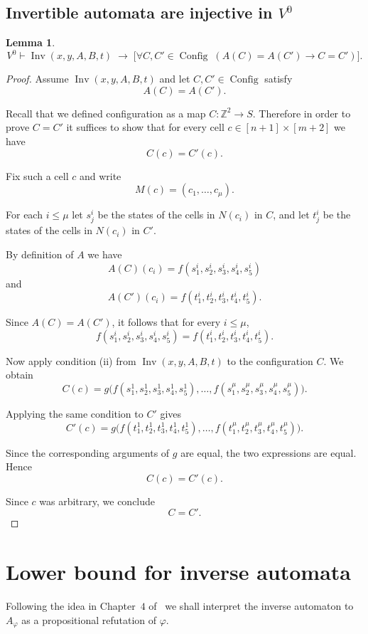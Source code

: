 \documentclass{article}
\theoremstyle{plain}
\newtheorem{lemma}[theorem]{Lemma}
\theoremstyle{definition}
\DeclareMathOperator{\Config}{Config}
\DeclareMathOperator{\Inv}{Inv}
\begin{document}
\subsection{Invertible automata are injective in $V^0$}

\begin{lemma}\label{lm:invertible_implies_injective}
\[
V^0 \vdash
\Inv(x,y,A,B,t)
\;\rightarrow\;
\bigl[
\forall C,C' \in \Config\;
(A(C)=A(C') \rightarrow C=C')
\bigr].
\]
\end{lemma}
\begin{proof}
Assume $\Inv(x,y,A,B,t)$ and let $C,C' \in \Config$ satisfy
\[
A(C)=A(C').
\]

Recall that we defined configuration as a map 
$C : \mathbb{Z}^2 \to S$. Therefore in order to prove $C=C'$ it suffices to show that for every cell
$c \in [n+1]\times[m+2]$ we have
\[
C(c)=C'(c).
\]

Fix such a cell $c$ and write
\[
M(c)=(c_1,\dots,c_\mu).
\]

For each $i\le \mu$ let $s^i_j$ be the states of the cells in $N(c_i)$ in $C$, and let $t^i_j$ be the states of the cells in $N(c_i)$ in $C'$.

By definition of $A$ we have
\[
A(C)(c_i)=f(s^i_1,s^i_2,s^i_3,s^i_4,s^i_5)
\]
and
\[
A(C')(c_i)=f(t^i_1,t^i_2,t^i_3,t^i_4,t^i_5).
\]

Since $A(C)=A(C')$, it follows that for every $i\le\mu$,
\[
f(s^i_1,s^i_2,s^i_3,s^i_4,s^i_5)
=
f(t^i_1,t^i_2,t^i_3,t^i_4,t^i_5).
\]

Now apply condition (ii) from $\Inv(x,y,A,B,t)$ to the
configuration $C$. We obtain
\[
C(c)=
g\bigl(
f(s^1_1,s^1_2,s^1_3,s^1_4,s^1_5),
\dots,
f(s^\mu_1,s^\mu_2,s^\mu_3,s^\mu_4,s^\mu_5)
\bigr).
\]

Applying the same condition to $C'$ gives
\[
C'(c)=
g\bigl(
f(t^1_1,t^1_2,t^1_3,t^1_4,t^1_5),
\dots,
f(t^\mu_1,t^\mu_2,t^\mu_3,t^\mu_4,t^\mu_5)
\bigr).
\]

Since the corresponding arguments of $g$ are equal, the two
expressions are equal. Hence
\[
C(c)=C'(c).
\]

Since $c$ was arbitrary, we conclude
\[
C=C'.
\]
\end{proof}

\section{Lower bound for inverse automata}\label{sec:lower_bound}

Following the idea in Chapter~$4$ of~\cite{Cavagnetto} we shall interpret the inverse automaton to $A_\varphi$ as a propositional refutation of $\varphi$.
\end{document}
